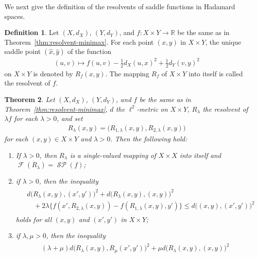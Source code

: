 \documentclass[draft]{amsart}
\numberwithin{equation}{section}
\def\R{\mathbb R}
\DeclareMathOperator{\Fix}{\mathcal{F}}
\DeclareMathOperator{\Saddle}{\mathcal{SP}}
\theoremstyle{plain}
\newtheorem{theorem}{Theorem}[section]
\theoremstyle{definition}
\newtheorem{definition}[theorem]{Definition}
\theoremstyle{remark}
\begin{document}
We next give the definition of the resolvents of saddle functions  
in Hadamard spaces. 

\begin{definition}
 \label{def:resolvent-of-saddle-function}
 Let $(X,d_X)$, $(Y,d_Y)$, 
 and $f\colon X\times Y\to \R$ be the same as in 
 Theorem~\ref{thm:resolvent-minimax}. 
 For each point $(x,y)$ in $X\times Y$, 
 the unique saddle point 
 $(\hat{x},\hat{y})$ of the function 
 \begin{align}
  (u,v) \mapsto  f(u,v) -\frac{1}{2}d_X(u,x)^2 + \frac{1}{2}d_Y(v,y)^2
 \end{align}
 on $X\times Y$ is denoted by $R_f(x,y)$. The mapping 
 $R_f$ of $X\times Y$ into itself is called the resolvent of $f$. 
\end{definition}

\begin{theorem}\label{thm:resolvent-saddle}
 Let $(X,d_X)$, $(Y,d_Y)$, and $f$ be the same as in 
 Theorem~\ref{thm:resolvent-minimax}, 
 $d$ the $\ell^2$-metric on $X\times Y$,  
 $R_{\lambda}$ the resolvent of $\lambda f$ for each $\lambda >0$, 
 and set 
 \begin{align}
  R_{\lambda}(x,y)=\bigl(R_{1,\lambda}(x,y),R_{2,\lambda}(x,y)\bigr)
 \end{align}
 for each $(x,y)\in X\times Y$ and $\lambda >0$. 
 Then the following hold: 
 \begin{enumerate}
  \item[(i)] If $\lambda>0$, then $R_{\lambda}$ is a single-valued mapping of 
 $X\times X$ into itself and $\Fix (R_{\lambda})=\Saddle (f)$; 
  \item[(ii)] if $\lambda>0$, then 
 the inequality 
 \begin{align}
  \begin{split}
  &d\bigl(R_{\lambda}(x,y), (x',y')\bigr)^2
 +d\bigl(R_{\lambda}(x,y), (x,y)\bigr)^2 \\
 &\quad +2\lambda \bigl\{f(x',R_{2,\lambda}(x,y))-f(R_{1,\lambda}(x,y),y')\bigr\} 
  \leq d\bigl((x,y), (x',y')\bigr)^2   
  \end{split}
 \end{align}
  holds for all $(x,y)$ and $(x',y')$ in $X\times Y$; 
  \item[(iii)] if $\lambda, \mu>0$, then 
 the inequality 
 \begin{align}
 \begin{split}
  &(\lambda+\mu)d\bigl(R_{\lambda}(x,y), R_{\mu}(x',y')\bigr)^2
 +\mu d\bigl(R_{\lambda}(x,y), (x,y)\bigr)^2 \\

\end{split}
\end{align}
\end{enumerate}
\end{theorem}
\end{document}
